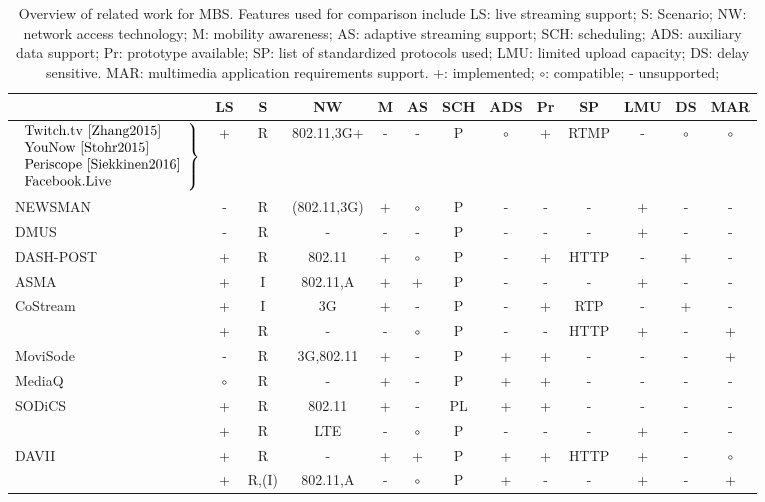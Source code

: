 \begin{table}
	\centering
	\caption[Discussion of related work on MBS]{Overview of related work for \acf{MBS}. Features used for comparison include LS: live streaming support; S: Scenario; NW: network access technology; M: mobility awareness; AS: adaptive streaming support; SCH: scheduling; ADS: auxiliary data support; Pr: prototype available; SP: list of standardized protocols used; LMU: limited upload capacity; DS: delay sensitive. MAR: multimedia application requirements support. +: implemented; $\circ$: compatible; - unsupported;}
	\begin{tabular}{lcccccccccccc}
		\toprule[1.5pt]
		&  \textbf{LS} &\textbf{S} & \textbf{NW} & \textbf{M} & \textbf{AS} &\textbf{SCH} &\textbf{ADS} &\textbf{Pr} &\textbf{SP}&\textbf{LMU} &\textbf{DS} &\textbf{MAR} \\ 
		\toprule[1.5pt]
	$ \left.\begin{array}{l} \mbox{Twitch.tv~\cite{Zhang2015}}\\\mbox{YouNow~\cite{Stohr2015}}\\\mbox{Periscope~\cite{Siekkinen2016}}\\\mbox{Facebook.Live} \end{array} \right\}$	&+  & R & 802.11,3G+& -	& - & P &  $\circ$  & + &  RTMP & - & $\circ$ & $\circ$\\ \hline
	NEWSMAN~\cite{Shah2016} 	& - & R &(802.11,3G)& + & $\circ$ & P &-  & - & - & + &- & -\\ %
	DMUS~\cite{Zhang2008}	 	& - & R & - 		& - &  -  & P &-  & - & - & + &- &-\\ %
	DASH-POST~\cite{Seo2012} 	& + & R & 802.11 	& + &  $\circ$ & P &-  & + & HTTP &- & +&-\\ %
	ASMA\cite{MinQin2010}		& + & I & 802.11,A	& + & + & P   & -  & - & - &+ &- &-\\
	CoStream~\cite{Dezfuli2012,Dezfuli2013}	& +  &I & 3G  		& +  & - & P   & -  & +  & RTP & -& +& -\\
	\cite{Siekkinen2016}& + & R & 	-	& - & $\circ$ & P & -  & - & HTTP & + &- &+\\
	MoviSode~\cite{Seshadri2015}& - &R&3G,802.11& + &- & P  & + & + & - &- &- &+\\
	MediaQ~\cite{Kim2014}		& $\circ$ &R &- 	& + &-  & P & + & + &- &- &- &- \\
	SODiCS~\cite{Ito2014}		& + & R & 802.11& + &-  & PL & + & + & - & - & - & -\\
	\cite{ElEssaili2015}	& + & R & LTE	&-  & $\circ$ & P & - & - & - & +& -& -\\
	DAVII~\cite{Johansen2009}	& + & R & -		& + & + & P & + & + & HTTP & + & - & $\circ$ \\
	\cite{Richerzhagen2016}	& + & R,(I)& 802.11,A & - & $\circ$ & P  & + & - & -& + & -& +\\
	\bottomrule[1.5pt]
	\end{tabular} 
	\label{tab:220_Related_Work}
\end{table}

